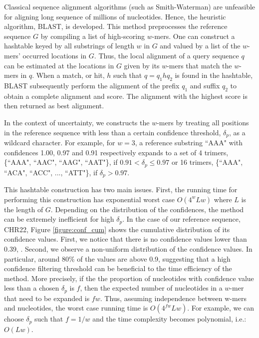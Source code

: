 \documentclass{article}
\begin{document}
Classical sequence alignment algorithms (such as Smith-Waterman) are unfeasible for aligning long sequence of millions of nucleotides. Hence, the heuristic algorithm, BLAST, is developed. \cite{blast} This method preprocesses the reference sequence $G$ by compiling a list of high-scoring $w$-mers. One can construct a hashtable keyed by all substrings of length $w$ in $G$ and valued by a list of the $w$-mers' occurred locations in $G$. Thus, the local alignment of a query sequence $q$ can be estimated at the locations in $G$ given by its $w$-mers that match the $w$-mers in $q$. When a match, or hit, $h$ such that $q = q_1hq_2$ is found in the hashtable, BLAST subsequently perform the alignment of the prefix $q_1$ and suffix $q_2$ to obtain a complete alignment and score. The alignment with the highest score is then returned as best alignment.

In the context of uncertainty, we constructs the $w$-mers by treating all positions in the reference sequence with less than a certain confidence threshold, $\delta_p$, as a wildcard character. For example, for $w = 3$, a reference substring ``AAA" with confidences 1.00, 0.97 and 0.91 respectively expands to a set of 4 trimers, \{``AAA", ``AAC", ``AAG", ``AAT"\}, if $0.91 < \delta_p \leq 0.97$ or 16 trimers, \{``AAA", ``ACA", ``ACC", ..., ``ATT"\}, if $\delta_p > 0.97$. 

This hashtable construction has two main issues. First, the running time for performing this construction has exponential worst case $O(4^wLw)$ where $L$ is the length of $G$. Depending on the distribution of the confidences, the method can be extremely inefficient for high $\delta_p$. In the case of our reference sequence, CHR22, Figure \ref{figure:conf_cum} shows the cumulative distribution of its confidence values. First, we notice that there is no confidence values lower than 0.39, . Second, we observe a non-uniform distribution of the confidence values. In particular, around 80\% of the values are above 0.9, suggesting that a high confidence filtering threshold can be beneficial to the time efficiency of the method. More precisely, if the the proportion of nucleotides with confidence value less than a chosen $\delta_p$ is $f$, then the expected number of nucleotides in a $w$-mer that need to be expanded is $fw$. Thus, assuming independence between w-mers and nucleotides, the worst case running time is $O(4^{fw}Lw)$. For example, we can choose $\delta_p$ such that $f = 1/w$ and the time complexity becomes polynomial, i.e.: $O(Lw)$. 
\end{document}

